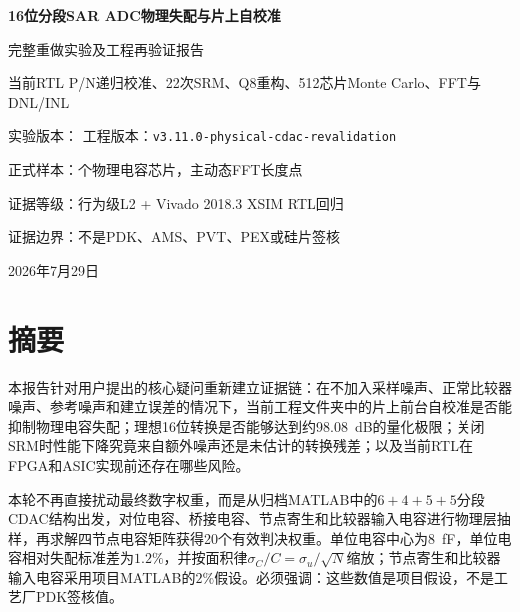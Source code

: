 \documentclass[11pt,a4paper,UTF8,fontset=none,openany]{ctexrep}
\numberwithin{equation}{chapter}
\numberwithin{figure}{chapter}
\numberwithin{table}{chapter}
\begin{document}
\begin{titlepage}
  \thispagestyle{empty}
  \centering
  \vspace*{34mm}
  {\ReferenceCJKTitle\bfseries\fontsize{17.22}{25}\selectfont
    16位分段SAR ADC物理失配与片上自校准\par
    完整重做实验及工程再验证报告\par}
  \vspace{9mm}
  {\fontsize{11.96}{18}\selectfont
    当前RTL P/N递归校准、22次SRM、Q8重构、512芯片Monte Carlo、FFT与DNL/INL\par}
  \vspace{17mm}
  \begin{minipage}{0.80\textwidth}
    \centering\small
    实验版本：\texttt{\ExperimentVersion}\quad
    工程版本：\texttt{v3.11.0-physical-cdac-revalidation}\par\vspace{5pt}
    正式样本：\ChipCount 个物理电容芯片，主动态FFT长度\FftLength 点\par\vspace{5pt}
    证据等级：行为级L2 + Vivado 2018.3 XSIM RTL回归\par\vspace{5pt}
    证据边界：不是PDK、AMS、PVT、PEX或硅片签核\par
  \end{minipage}
  \vfill
  {\fontsize{11.96}{18}\selectfont 2026年7月29日\par}
\end{titlepage}


\chapter*{摘要}

本报告针对用户提出的核心疑问重新建立证据链：在不加入采样噪声、正常比较器噪声、参考噪声和建立误差的情况下，当前工程文件夹中的片上前台自校准是否能抑制物理电容失配；理想16位转换是否能够达到约\SI{98.08}{dB}的量化极限；关闭SRM时性能下降究竟来自额外噪声还是未估计的转换残差；以及当前RTL在FPGA和ASIC实现前还存在哪些风险。

本轮不再直接扰动最终数字权重，而是从归档MATLAB中的$6+4+5+5$分段CDAC结构出发，对位电容、桥接电容、节点寄生和比较器输入电容进行物理层抽样，再求解四节点电容矩阵获得20个有效判决权重。单位电容中心为\SI{8}{fF}，单位电容相对失配标准差为$1.2\%$，并按面积律$\sigma_C/C=\sigma_u/\sqrt{N}$缩放；节点寄生和比较器输入电容采用项目MATLAB的$2\%$假设。必须强调：这些数值是项目假设，不是工艺厂PDK签核值。
\end{document}
